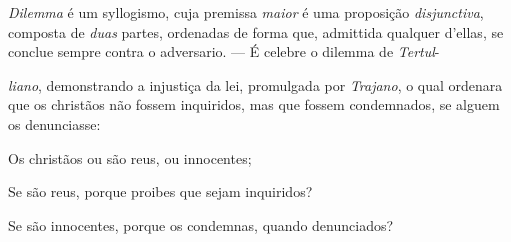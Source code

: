
\emph{Dilemma} é um syllogismo, cuja premissa \emph{maior} é uma proposição \emph{disjunctiva}, composta de \emph{duas} partes, ordenadas de forma que, admittida qualquer d'ellas, se conclue sempre contra o adversario. --- É celebre o dilemma de \emph{Tertul}-

\emph{liano}, demonstrando a injustiça da lei, promulgada por \emph{Trajano}, o qual ordenara que os christãos não fossem inquiridos, mas que fossem condemnados, se alguem os denunciasse:

Os christãos ou são reus, ou innocentes;

Se são reus, porque proibes que sejam inquiridos?

Se são innocentes, porque os condemnas, quando denunciados?

